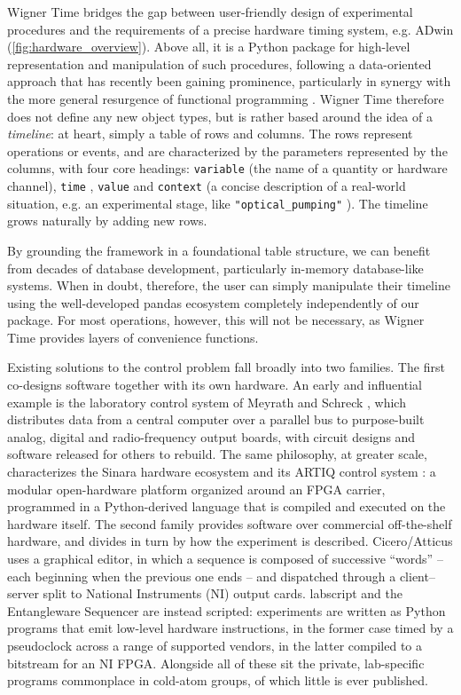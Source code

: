 \documentclass{SciPost}
\newcommand{\python}[1]{%
  \texttt{#1}%
}
\begin{document}
 
Wigner Time bridges the gap between user-friendly design of experimental procedures and the requirements of a precise hardware timing system, e.g. ADwin (\cref{fig:hardware_overview}). Above all, it is a Python package for high-level representation and manipulation of such procedures, following a data-oriented approach that has recently been gaining prominence, particularly in synergy with the more general resurgence of functional programming \cite{dop2022, hanson2021software, hickey2008clojure}. Wigner Time therefore does not define any new object types, but is rather based around the idea of a \emph{timeline}: at heart, simply a table of rows and columns. The rows represent operations or events, and are characterized by the parameters represented by the columns, with four core headings: \python{variable} (the name of a quantity or hardware channel), \python{time}, \python{value} and \python{context} (a concise description of a real-world situation, e.g. an experimental stage, like \python{"optical_pumping"}). The timeline grows naturally by adding new rows.
 
By grounding the framework in a foundational table structure, we can benefit from decades of database development, particularly in-memory database-like systems. When in doubt, therefore, the user can simply manipulate their timeline using the well-developed pandas ecosystem completely independently of our package. For most operations, however, this will not be necessary, as Wigner Time provides layers of convenience functions.
 
Existing solutions to the control problem fall broadly into two families. The first co-designs software together with its own hardware. An early and influential example is the laboratory control system of Meyrath and Schreck \cite{meyrath_schreck_control}, which distributes data from a central computer over a parallel bus to purpose-built analog, digital and radio-frequency output boards, with circuit designs and software released for others to rebuild. The same philosophy, at greater scale, characterizes the Sinara hardware ecosystem and its ARTIQ control system \cite{kasprowicz2020artiq,bourdeauducq2016artiq}: a modular open-hardware platform organized around an FPGA carrier, programmed in a Python-derived language that is compiled and executed on the hardware itself. The second family provides software over commercial off-the-shelf hardware, and divides in turn by how the experiment is described. Cicero/Atticus \cite{keshet2013distributed} uses a graphical editor, in which a sequence is composed of successive “words” – each beginning when the previous one ends – and dispatched through a client–server split to National Instruments (NI) output cards. labscript \cite{starkey2013labscript,labscript} and the Entangleware Sequencer \cite{kowalski2023entangleware} are instead scripted: experiments are written as Python programs that emit low-level hardware instructions, in the former case timed by a pseudoclock across a range of supported vendors, in the latter compiled to a bitstream for an NI FPGA. Alongside all of these sit the private, lab-specific programs commonplace in cold-atom groups, of which little is ever published.
 
\end{document}
